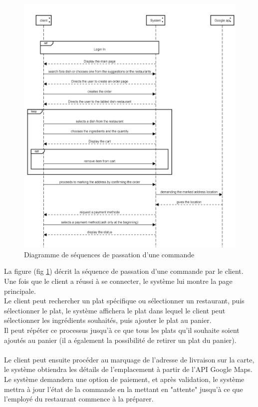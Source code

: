 \documentclass[french, a4paper, 12pt]{report}
\begin{document}
			\newpage	
			\begin{figure}[!h]
  				\center
  				\includegraphics[width=15cm]{seqorder.png}
  				\caption{Diagramme de séquences de passation d'une commande}
  				\label{fig:seqorder}
			\end{figure} La figure (fig \ref{fig:seqorder}) décrit la séquence de passation d'une commande par le client. Une fois que le client a réussi à se connecter, le système lui montre la page principale.\\Le client peut rechercher un plat spécifique ou sélectionner un restaurant, puis sélectionner le plat, le système affichera le plat dans lequel le client peut sélectionner les ingrédients souhaités, puis ajouter le plat au panier.\\Il peut répéter ce processus jusqu'à ce que tous les plats qu'il souhaite soient ajoutés au panier (il a également la possibilité de retirer un plat du panier).\\\\
Le client peut ensuite procéder au marquage de l'adresse de livraison sur la carte, le système obtiendra les détails de l'emplacement à partir de l'API Google Maps.\\
Le système demandera une option de paiement, et après validation, le système mettra à jour l'état de la commande en la mettant en "attente" jusqu'à ce que l'employé du restaurant commence à la préparer.
			
\end{document}
